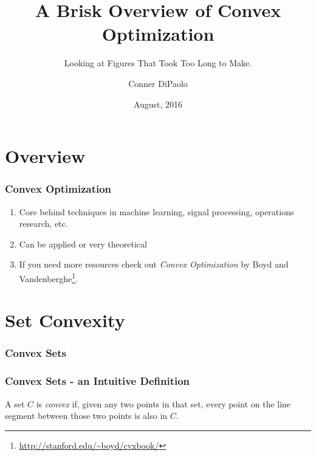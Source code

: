 \documentclass{beamer}
\title{A Brisk Overview of Convex Optimization}
\subtitle{Looking at Figures That Took Too Long to Make.}
\author{Conner DiPaolo}
\institute{Harvey Mudd College / Yelp}
\date{August, 2016}
\begin{document}
\frame{\titlepage}

\section{Overview}
\begin{frame}
    \frametitle{Convex Optimization}
    \begin{enumerate}
        \item Core behind techniques in machine learning, signal processing, operations research, etc.
        \item Can be  applied or very theoretical
        \item If you need more resources check out \textit{Convex Optimization} by Boyd and
            Vandenberghe\footnote{\url{http://stanford.edu/~boyd/cvxbook/}}.
    \end{enumerate}
\end{frame}

\section{Set Convexity}
\begin{frame}
    \frametitle{Convex Sets}
    \begin{center}
    \end{center}
\end{frame}

\begin{frame}
    \frametitle{Convex Sets - an Intuitive Definition}
    A set $C$ is \textit{convex} if, given any two points in that set, every point on the line
    segment between those two points is also in $C$.
\end{frame}
\end{document}
